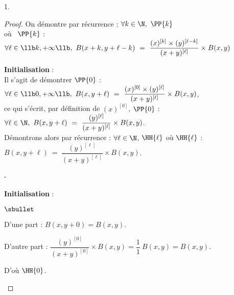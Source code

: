 \begin{noliste}{1.}
\begin{proof}
    
    \noindent
    On démontre par récurrence : $\forall k \in \N, \ \PP{k}$
    \\
    où \ $\PP{k}$ : $\forall \ell \in \llb k, +\infty \llb, \ B(x+k,
    y+\ell-k) \ = \ \dfrac{(x)^{[k]} \times (y)^{[\ell-k]}}{(x +
      y)^{[\ell]}} \times B(x,y)$
    \begin{noliste}{\fitem}
    \item {\bf Initialisation} :\\
      Il s'agit de démontrer $\PP{0}$ : $\forall \ell \in \llb 0,
      +\infty \llb, \ B(x, y+\ell) \ = \ \dfrac{(x)^{[0]} \times
        (y)^{[\ell]}}{(x + y)^{[\ell]}} \times B(x,y)$,\\
      ce qui s'écrit, par définition de $(x)^{[0]}$, $\PP{0}$ :
      $\forall \ell \in \N, \ B(x, y+\ell) \ = \
      \dfrac{(y)^{[\ell]}}{(x + y)^{[\ell]}} \times B(x,y)$.\\[.4cm]
      Démontrons alors par récurrence : $\forall \ell \in \N$,
      $\HH{\ell}$ \quad où \quad $\HH{\ell}$ : $B(x, y+\ell) \ = \
      \dfrac{(y)^{[\ell]}}{(x + y)^{[\ell]}} \times B(x,y)$.
      
      \begin{noliste}{-}
      \item {\bf Initialisation} :
        \begin{noliste}{$\sbullet$}
        \item D'une part : $B(x, y + 0) = B(x, y)$.
        \item D'autre part : $\dfrac{(y)^{[0]}}{(x + y)^{[0]}}
          \times B(x,y) = \dfrac{1}{1} \ B(x, y) = B(x, y)$.            
        \end{noliste}
        D'où $\HH{0}$.
        

\end{noliste}
\end{noliste}
\end{proof}
\end{noliste}
